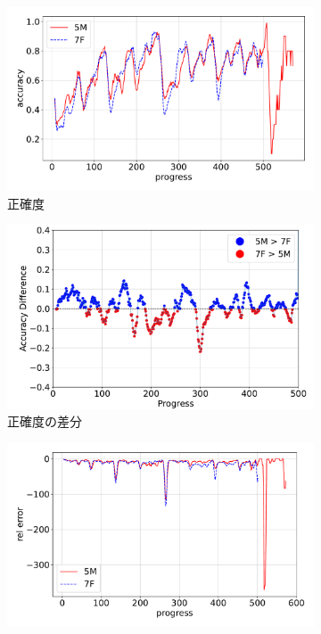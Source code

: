 \begin{figure}[t]
\centering
\begin{subfigure}[b]{0.49\linewidth}
    \includegraphics[width=\linewidth]{pdf/compare/NT5M_and_NT7F/accuracy.pdf}
    \caption{正確度}
    \label{fig:NT5M_and_NT7F_accuracy}
\end{subfigure}
\begin{subfigure}[b]{0.49\linewidth}
    \includegraphics[width=\linewidth]{pdf/compare/NT5M_and_NT7F/acc_diff_plot.pdf}
    \caption{正確度の差分}
    \label{fig:NT5M_and_NT7F_acc_diff}
\end{subfigure}
\begin{subfigure}[b]{0.49\linewidth}
    \includegraphics[width=\linewidth]{pdf/compare/NT5M_and_NT7F/error_abs.pdf}

\end{subfigure}
\end{figure}
